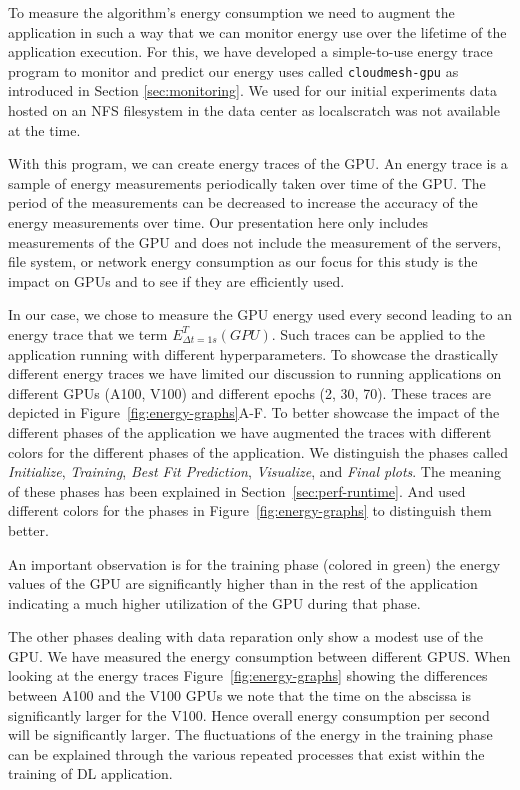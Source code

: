 \documentclass[utf8]{FrontiersinVancouver} %
\begin{document}
To measure the algorithm's energy consumption we need to augment the application in such a way that we can monitor energy use over the lifetime of the application execution. For this, we have developed a simple-to-use energy trace program to monitor and predict our energy uses called \verb|cloudmesh-gpu| as introduced in Section \ref{sec:monitoring}.  We used for our initial experiments data hosted on an NFS filesystem in the data center as localscratch was not available at the time.


With this program, we can create energy traces of the GPU. An energy trace is a sample of energy measurements periodically taken over time of the GPU. The period of the measurements can be decreased to increase the accuracy of the energy measurements over time. Our presentation here only includes measurements of the GPU and does not include the measurement of the servers, file system, or network energy consumption as our focus for this study is the impact on GPUs and to see if they are efficiently used.

In our case, we chose to measure the GPU energy used every second leading to an energy trace that we term $E^T_{\Delta t=1s}(GPU)$. Such traces can be applied to the application running with different hyperparameters. To showcase the drastically different energy traces we have limited our discussion to running applications on different GPUs (A100, V100) and different epochs (2, 30, 70). These traces are depicted in Figure~\ref{fig:energy-graphs}A-F.  To better showcase the impact of the different phases of the application we have augmented the traces with different colors for the different phases of the application.  We distinguish the phases called {\em Initialize}, {\em Training}, {\em Best Fit Prediction}, {\em Visualize}, and {\em Final plots}. The meaning of these phases has been explained in Section~\ref{sec:perf-runtime}. And used different colors for the phases in Figure~\ref{fig:energy-graphs} to distinguish them better.

An important observation is for the training phase (colored in green) the energy values of the GPU are significantly higher than in the rest of the application indicating a much higher utilization of the GPU during that phase.

The other phases dealing with data reparation only show a modest use of the GPU. We have measured the energy consumption between different GPUS.  When looking at the energy traces Figure~\ref{fig:energy-graphs} showing the differences between A100 and the V100 GPUs we note that the time on the abscissa is significantly larger for the V100. Hence overall energy consumption per second will be significantly larger. The fluctuations of the energy in the training phase can be explained through the various repeated processes that exist within the training of DL application.
\end{document}
